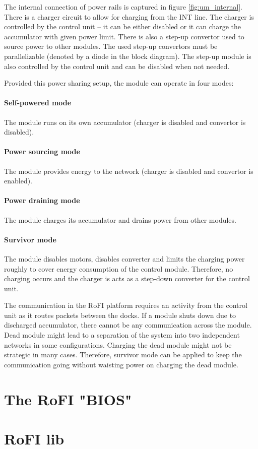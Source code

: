 The internal connection of power rails is captured in figure
\ref{fig:um_internal}. There is a charger circuit to allow for charging from the
INT line. The charger is controlled by the control unit -- it can be either
disabled or it can charge the accumulator with given power limit. There is also
a step-up convertor used to source power to other modules. The used step-up
convertors must be parallelizable (denoted by a diode in the block diagram). The
step-up module is also controlled by the control unit and can be disabled when
not needed.

Provided this power sharing setup, the module can operate in four modes:

\paragraph{Self-powered mode} The module runs on its own accumulator (charger is
disabled and convertor is disabled).

\paragraph{Power sourcing mode} The module provides energy to the network
(charger is disabled and convertor is enabled).

\paragraph{Power draining mode} The module charges its accumulator and drains
power from other modules.

\paragraph{Survivor mode} The module disables motors, disables converter and
limits the charging power roughly to cover energy consumption of the control
module. Therefore, no charging occurs and the charger is acts as a step-down
converter for the control unit.

The communication in the RoFI platform requires an activity from the control
unit as it routes packets between the docks. If a module shuts down due to
discharged accumulator, there cannot be any communication across the module.
Dead module might lead to a separation of the system into two independent
networks in some configurations. Charging the dead module might not be strategic
in many cases. Therefore, survivor mode can be applied to keep the communication
going without waisting power on charging the dead module.

\section{The RoFI "BIOS"}

\section{RoFI lib}

